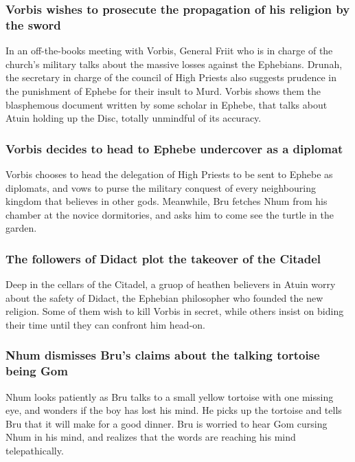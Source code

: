 \subsubsection{\Gls{Vorbis} wishes to prosecute the propagation of his religion by the sword}
In an off-the-books meeting with \Gls{Vorbis}, General \Gls{Friit} who is in charge of the church's
military talks about the massive losses against the Ephebians. \Gls{Drunah}, the secretary in charge
of the council of High Priests also suggests prudence in the punishment of Ephebe for their insult
to \Gls{Murd}. \Gls{Vorbis} shows them the blasphemous document written by some scholar in Ephebe,
that talks about \Gls{Atuin} holding up the Disc, totally unmindful of its accuracy.

\subsubsection{\Gls{Vorbis} decides to head to Ephebe undercover as a diplomat}
\Gls{Vorbis} chooses to head the delegation of High Priests to be sent to Ephebe as diplomats, and
vows to purse the military conquest of every neighbouring kingdom that believes in other gods.
Meanwhile, \Gls{Bru} fetches \Gls{Nhum} from his chamber at the novice dormitories, and asks him to
come see the turtle in the garden.

\subsubsection{The followers of \Gls{Didact} plot the takeover of the Citadel}
Deep in the cellars of the Citadel, a gruop of heathen believers in \Gls{Atuin} worry about the
safety of \Gls{Didact}, the Ephebian philosopher who founded the new religion. Some of them wish to
kill \Gls{Vorbis} in secret, while others insist on biding their time until they can confront him
head-on.

\subsubsection{\Gls{Nhum} dismisses \Gls{Bru}'s claims about the talking tortoise being \Gls{Gom}}
\Gls{Nhum} looks patiently as \Gls{Bru} talks to a small yellow tortoise with one missing eye, and
wonders if the boy has lost his mind. He picks up the tortoise and tells \Gls{Bru} that it will make
for a good dinner. \Gls{Bru} is worried to hear \Gls{Gom} cursing \Gls{Nhum} in his mind, and
realizes that the words are reaching his mind telepathically.

